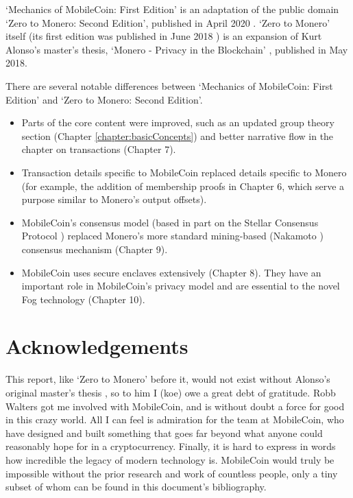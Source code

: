`Mechanics of MobileCoin: First Edition' is an adaptation of the public domain `Zero to Monero: Second Edition', published in April 2020 \cite{ztm-2}. `Zero to Monero' itself (its first edition was published in June 2018 \cite{ztm-1}) is an expansion of Kurt Alonso's master's thesis, `Monero - Privacy in the Blockchain' \cite{kurt-original}, published in May 2018.

There are several notable differences between `Mechanics of MobileCoin: First Edition' and `Zero to Monero: Second Edition'.

\begin{itemize}
    \item Parts of the core content were improved, such as an updated group theory section (Chapter \ref{chapter:basicConcepts}) and better narrative flow in the chapter on transactions (Chapter 7).
    \item Transaction details specific to MobileCoin replaced details specific to Monero (for example, the addition of membership proofs in Chapter 6, which serve a purpose similar to Monero's output offsets).%
    \item MobileCoin's consensus model (based in part on the Stellar Consensus Protocol \cite{stellar-consensus-protocol}) replaced Monero's more standard mining-based (Nakamoto \cite{Nakamoto_bitcoin}) consensus mechanism (Chapter 9).
    \item MobileCoin uses secure enclaves extensively (Chapter 8). They have an important role in MobileCoin's privacy model and are essential to the novel Fog technology (Chapter 10).%
\end{itemize}



\section{Acknowledgements}
\label{sec:acknowledgements}


This report, like `Zero to Monero' before it, would not exist without Alonso's original master's thesis \cite{kurt-original}, so to him I (koe) owe a great debt of gratitude. Robb Walters got me involved with MobileCoin, and is without doubt a force for good in this crazy world. All I can feel is admiration for the team at MobileCoin, who have designed and built something that goes far beyond what anyone could reasonably hope for in a cryptocurrency. Finally, it is hard to express in words how incredible the legacy of modern technology is. MobileCoin would truly be impossible without the prior research and work of countless people, only a tiny subset of whom can be found in this document's bibliography.